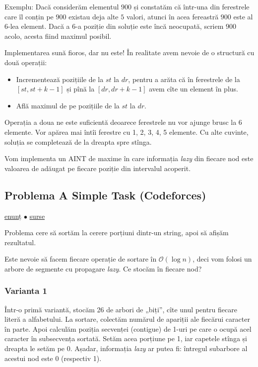 \documentclass[../main.tex]{subfiles}
\begin{document}
Exemplu: Dacă considerăm elementul $900$ și constatăm că într-una din ferestrele care îl conțin pe $900$ existau deja alte $5$ valori, atunci în acea fereastră $900$ este al $6$-lea element. Dacă a $6$-a poziție din soluție este încă neocupată, scriem $900$ acolo, acesta fiind maximul posibil.

Implementarea sună fioros, dar nu este! În realitate avem nevoie de o structură cu două operații:

\begin{itemize}
  \item Incrementează pozițiile de la $st$ la $dr$, pentru a arăta că în ferestrele de la $[st, st+k-1]$ și pînă la $[dr, dr + k - 1]$ avem cîte un element în plus.
  \item Află maximul de pe pozițiile de la $st$ la $dr$.
\end{itemize}

Operația a doua ne este suficientă deoarece ferestrele nu vor ajunge brusc la 6 elemente. Vor apărea mai întîi ferestre cu 1, 2, 3, 4, 5 elemente. Cu alte cuvinte, soluția se completează de la dreapta spre stînga.

Vom implementa un AINT de maxime în care informația \textit{lazy} din fiecare nod este valoarea de adăugat pe fiecare poziție din intervalul acoperit.

\subsection{Problema A Simple Task (Codeforces)}
\label{problem:a-simple-task}

\href{https://codeforces.com/problemset/problem/558/E}{enunț}
$\bullet$
\hyperref[code:a-simple-task]{surse}

Problema cere să sortăm la cerere porțiuni dintr-un string, apoi să afișăm rezultatul.

Este nevoie să facem fiecare operație de sortare în \(\mathcal{O}(\log n)\), deci vom folosi un arbore de segmente cu propagare \textit{lazy}. Ce stocăm în fiecare nod?

\subsubsection*{Varianta 1}

Într-o primă variantă, stocăm 26 de arbori de „biți”, cîte unul pentru fiecare literă a alfabetului. La sortare, colectăm numărul de apariții ale fiecărui caracter în parte. Apoi calculăm poziția secvenței (contigue) de 1-uri pe care o ocupă acel caracter în subsecvența sortată. Setăm acea porțiune pe 1, iar capetele stînga și dreapta le setăm pe 0. Așadar, informația \textit{lazy} ar putea fi: întregul subarbore al acestui nod este 0 (respectiv 1).
\end{document}
